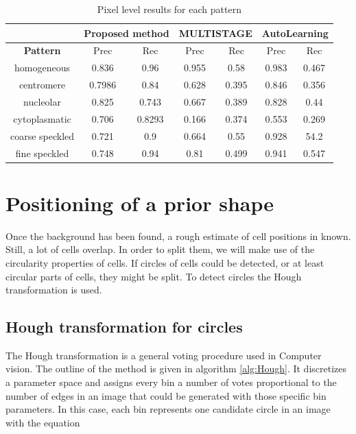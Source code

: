 \begin{table}
	\caption{Pixel level results for each pattern}
	\label{tab:Pix}
	\begin{tabular}{|c||c|c||c|c||c|c|}
	\hline
	 & \multicolumn{2}{c}{Proposed method} & \multicolumn{2}{c}{MULTISTAGE} & \multicolumn{2}{c}{AutoLearning} \\
	\hline
	 \textbf{Pattern} & Prec & Rec & Prec & Rec & Prec & Rec \\
	 \hline
	 \hline
	 homogeneous & 0.836 & 0.96 & 0.955 & 0.58 & 0.983 & 0.467 \\
	 centromere & 0.7986 & 0.84 & 0.628 & 0.395 & 0.846 & 0.356 \\
	 nucleolar & 0.825 & 0.743 & 0.667 & 0.389 & 0.828 & 0.44 \\
	 cytoplasmatic & 0.706 & 0.8293 & 0.166 & 0.374 & 0.553 & 0.269 \\
	 coarse speckled & 0.721 & 0.9 & 0.664 & 0.55 & 0.928 & 54.2 \\
	 fine speckled & 0.748 & 0.94 & 0.81 & 0.499 & 0.941 & 0.547 \\
	 \hline
	\end{tabular}
\end{table}



\section{Positioning of a prior shape}

Once the background has been found, a rough estimate of cell positions in known. Still, a lot of cells overlap. In order to split them, we will make use of the circularity properties of cells. If circles of cells could be detected, or at least circular parts of cells, they might be split. To detect circles the Hough transformation is used.

\subsection{Hough transformation for circles}

The Hough transformation is a general voting procedure used in Computer vision. The outline of the method is given in algorithm \ref{alg:Hough}. It discretizes a parameter space and assigns every bin a number of votes proportional to the number of edges in an image that could be generated with those specific bin parameters. In this case, each bin represents one candidate circle in an image with the equation 

